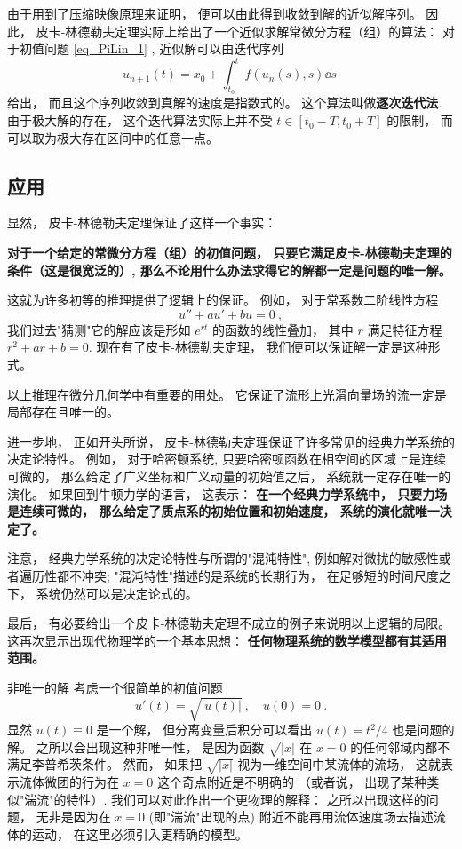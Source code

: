 由于用到了压缩映像原理来证明， 便可以由此得到收敛到解的近似解序列。 因此， 皮卡-林德勒夫定理实际上给出了一个近似求解常微分方程（组）的算法： 对于初值问题 \autoref{eq_PiLin_1} , 近似解可以由迭代序列
$$
u_{n+1}(t)=x_0+\int_{t_0}^tf(u_n(s),s)\dd s~
$$
给出， 而且这个序列收敛到真解的速度是指数式的。 这个算法叫做\textbf{逐次迭代法}. 由于极大解的存在， 这个迭代算法实际上并不受 $t\in [t_0-T,t_0+T]$ 的限制， 而可以取为极大存在区间中的任意一点。

\subsection{应用}
显然， 皮卡-林德勒夫定理保证了这样一个事实： 

\textbf{对于一个给定的常微分方程（组）的初值问题， 只要它满足皮卡-林德勒夫定理的条件（这是很宽泛的）, 那么不论用什么办法求得它的解都一定是问题的唯一解。}

这就为许多初等的推理提供了逻辑上的保证。 例如， 对于常系数二阶线性方程
$$
u''+au'+bu=0~,
$$
我们过去"猜测"它的解应该是形如 $e^{rt}$ 的函数的线性叠加， 其中 $r$ 满足特征方程 $r^2+ar+b=0$. 现在有了皮卡-林德勒夫定理， 我们便可以保证解一定是这种形式。 

以上推理在微分几何学中有重要的用处。 它保证了流形上光滑向量场的流一定是局部存在且唯一的。

进一步地， 正如开头所说， 皮卡-林德勒夫定理保证了许多常见的经典力学系统的决定论特性。 例如， 对于哈密顿系统, 只要哈密顿函数在相空间的区域上是连续可微的， 那么给定了广义坐标和广义动量的初始值之后， 系统就一定存在唯一的演化。 如果回到牛顿力学的语言， 这表示： \textbf{在一个经典力学系统中， 只要力场是连续可微的， 那么给定了质点系的初始位置和初始速度， 系统的演化就唯一决定了。}

注意， 经典力学系统的决定论特性与所谓的"混沌特性", 例如解对微扰的敏感性或者遍历性都不冲突; "混沌特性"描述的是系统的长期行为， 在足够短的时间尺度之下， 系统仍然可以是决定论式的。

最后， 有必要给出一个皮卡-林德勒夫定理不成立的例子来说明以上逻辑的局限。 这再次显示出现代物理学的一个基本思想： \textbf{任何物理系统的数学模型都有其适用范围。}
\begin{example}{非唯一的解}
考虑一个很简单的初值问题
$$
u'(t)=\sqrt{|u(t)|}~,\quad u(0)=0~.
$$
显然 $u(t)\equiv0$ 是一个解， 但分离变量后积分可以看出 $u(t)=t^2/4$ 也是问题的解。 之所以会出现这种非唯一性， 是因为函数 $\sqrt{|x|}$ 在 $x=0$ 的任何邻域内都不满足李普希茨条件。 然而， 如果把 $\sqrt{|x|}$ 视为一维空间中某流体的流场， 这就表示流体微团的行为在 $x=0$ 这个奇点附近是不明确的 （或者说， 出现了某种类似"湍流"的特性）. 我们可以对此作出一个更物理的解释： 之所以出现这样的问题， 无非是因为在 $x=0$ (即"湍流"出现的点) 附近不能再用流体速度场去描述流体的运动， 在这里必须引入更精确的模型。
\end{example}
